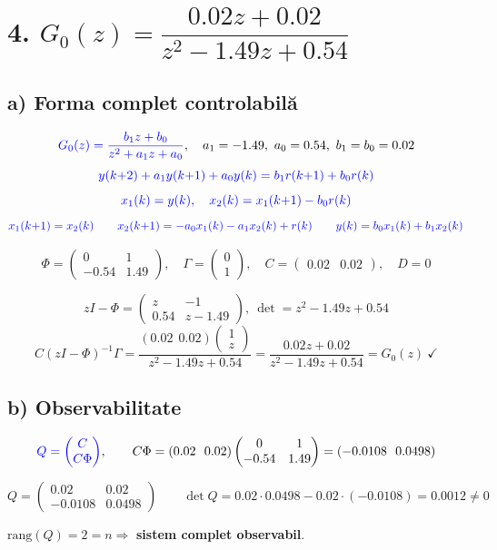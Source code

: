 \documentclass[10pt,a4paper]{article}
\begin{document}
\section*{4. $G_0(z)=\dfrac{0.02z+0.02}{z^2-1.49z+0.54}$}

\subsection*{a) Forma complet controlabilă}
$$\textcolor{blue}{G_0(z)=\frac{b_1z+b_0}{z^2+a_1z+a_0}},\quad a_1=-1.49,\ a_0=0.54,\ b_1=b_0=0.02$$
$$\color{blue}y(k{+}2)+a_1y(k{+}1)+a_0y(k)=b_1r(k{+}1)+b_0r(k)$$
$$\color{blue}x_1(k)=y(k),\quad x_2(k)=x_1(k{+}1)-b_0r(k)$$
$$\color{blue}x_1(k{+}1)=x_2(k)\qquad x_2(k{+}1)=-a_0x_1(k)-a_1x_2(k)+r(k)\qquad y(k)=b_0x_1(k)+b_1x_2(k)$$
\begin{res}
$$\Phi=\begin{pmatrix}0&1\\-0.54&1.49\end{pmatrix},\quad \Gamma=\begin{pmatrix}0\\1\end{pmatrix},\quad C=\begin{pmatrix}0.02&0.02\end{pmatrix},\quad D=0$$
\end{res}
\begin{chk}
$$zI-\Phi=\begin{pmatrix}z&-1\\0.54&z-1.49\end{pmatrix},\ \det=z^2-1.49z+0.54$$
$$C(zI-\Phi)^{-1}\Gamma=\frac{(0.02\ \ 0.02)\begin{pmatrix}1\\z\end{pmatrix}}{z^2-1.49z+0.54}=\frac{0.02z+0.02}{z^2-1.49z+0.54}=G_0(z)\ \checkmark$$
\end{chk}

\subsection*{b) Observabilitate}
$$\textcolor{blue}{Q=\begin{pmatrix}C\\C\Phi\end{pmatrix}},\qquad C\Phi=(0.02\ \ 0.02)\begin{pmatrix}0&1\\-0.54&1.49\end{pmatrix}=(-0.0108\ \ 0.0498)$$
\begin{res}
$$Q=\begin{pmatrix}0.02&0.02\\-0.0108&0.0498\end{pmatrix}\qquad \det Q=0.02\cdot0.0498-0.02\cdot(-0.0108)=0.0012\ne0$$
\end{res}
$\mathrm{rang}(Q)=2=n\Rightarrow$ \textbf{sistem complet observabil}.
\end{document}
